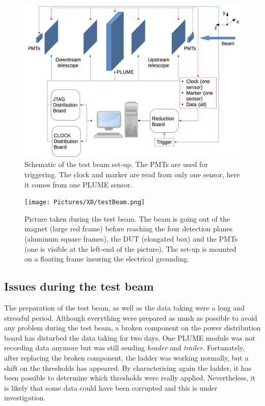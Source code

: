     \begin{figure}[!h]
      \centering
      \includegraphics[width = \textwidth]{Pictures/X0/testBeamAcquisition.png}
      \caption{Schematic of the test beam set-up. The PMTs are used for triggering. The clock and marker are read from only one sensor, here it comes from one PLUME sensor.}
      \label{fig:testBeamAcq}
    \end{figure}

    \begin{figure}
      \centering
      \texttt{[image: Pictures/X0/testBeam.png]}
      \caption{Picture taken during the test beam. The beam is going out of the magnet (large red frame) before reaching the four detection planes (aluminum square frames), the DUT (elongated box) and the PMTs (one is visible at the left-end of the picture). The set-up is mounted on a floating frame insuring the electrical grounding.}
      \label{fig:testBeam}
    \end{figure}

    \subsection{Issues during the test beam}

    The preparation of the test beam, as well as the data taking were a long and stressful period.
    Although everything were prepared as mush as possible to avoid any problem during the test beam, a broken component on the power distribution board has disturbed the data taking for two days.
    One \gls{PLUME} module was not recording data anymore but was still sending \textit{header} and \textit{trailer}.
    Fortunately, after replacing the broken component, the ladder was working normally, but a shift on the thresholds has appeared.
    By characterising again the ladder, it has been possible to determine which thresholds were really applied. 
    Nevertheless, it is likely that some data could have been corrupted and this is under investigation.
   
